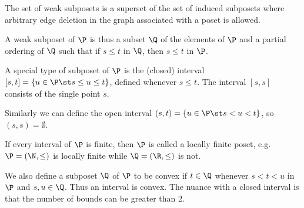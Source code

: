 
The set of weak subposets is a superset of the set of induced subposets where
arbitrary edge deletion in the graph associated with a poset is allowed.


A weak subposet of $\P$ is thus a subset $\Q$ of the elements of $\P$ and a
partial ordering of $\Q$ such that if $s \leq t$ in $\Q$, then $s \leq t$ in $\P$.



A special type of subposet of $\P$ is the (closed) interval $[s, t] = \left\{{u
\in \P \st s \leq u \leq t}\right\}$, defined whenever $s \leq t$. The interval
$[s, s]$ consists of the single point $s$.


Similarly we can define the open interval $(s, t) = \left\{{u \in \P \st s < u <
t}\right\}$, so $(s, s) = \emptyset$.

If every interval of $\P$ is finite, then $\P$ is called a locally finite poset,
e.g. $\P = (\N, \le)$ is locally finite while $\Q = (\R, \le)$ is
not.


We also define a subposet $\Q$ of $\P$ to be convex if $t \in \Q$ whenever $s < t
< u$ in $\P$ and $s, u \in \Q$. Thus an interval is convex. The nuance with a
closed interval is that the number of bounds can be greater than 2.


